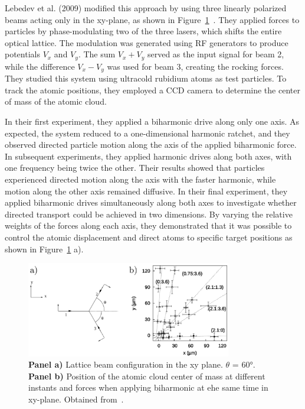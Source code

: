  Lebedev et al. (2009) modified this approach by using three linearly polarized beams acting only in the xy-plane, as shown in Figure~\ref{fig:lebedevexperiment}~\cite{lebedev2009two}. They applied forces to particles by phase-modulating two of the three lasers, which shifts the entire optical lattice. The modulation was generated using RF generators to produce potentials $V_x$ and $V_y$. The sum $V_x + V_y$ served as the input signal for beam 2, while the difference $V_x - V_y$ was used for beam 3, creating the rocking forces. They studied this system using ultracold rubidium atoms as test particles. To track the atomic positions, they employed a CCD camera to determine the center of mass of the atomic cloud.

 In their first experiment, they applied a biharmonic drive along only one axis. As expected, the system reduced to a one-dimensional harmonic ratchet, and they observed directed particle motion along the axis of the applied biharmonic force. In subsequent experiments, they applied harmonic drives along both axes, with one frequency being twice the other. Their results showed that particles experienced directed motion along the axis with the faster harmonic, while motion along the other axis remained diffusive. In their final experiment, they applied biharmonic drives simultaneously along both axes to investigate whether directed transport could be achieved in two dimensions. By varying the relative weights of the forces along each axis, they demonstrated that it was possible to control the atomic displacement and direct atoms to specific target positions as shown in Figure~\ref{fig:lebedevexperiment} a).


 \begin{figure}[h]
  \begin{center}
    \includegraphics[width=0.80\textwidth]{figures/LebedevExperiment.png}
  \end{center}
  \caption[Lebedev experiment.]{\textbf{Panel a)} Lattice beam configuration in the xy plane. $\theta$ = 60°. \textbf{Panel b)} Position of the atomic cloud center of mass at different instants and forces when applying biharmonic at ehe same time in xy-plane. Obtained from~\cite{lebedev2009two}.}\label{fig:lebedevexperiment}
 \end{figure}


